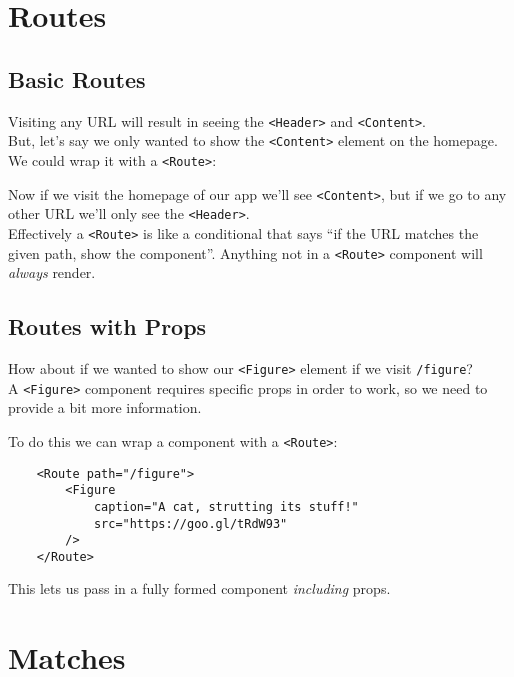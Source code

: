 \pagebreak


\section{Routes}

\subsection{Basic Routes}

Visiting any URL will result in seeing the \texttt{<Header>} and \texttt{<Content>}.
\\

But, let's say we only wanted to show the \texttt{<Content>} element on the homepage. We could wrap it with a \texttt{<Route>}:


Now if we visit the homepage of our app we'll see \texttt{<Content>}, but if we go to any other URL we'll only see the \texttt{<Header>}.
\\

Effectively a \texttt{<Route>} is like a conditional that says ``if the URL matches the given path, show the component''. Anything not in a \texttt{<Route>} component will \textit{always} render.


\subsection{Routes with Props}

How about if we wanted to show our \texttt{<Figure>} element if we visit \texttt{/figure}?
\\

A \texttt{<Figure>} component requires specific props in order to work, so we need to provide a bit more information.

\pagebreak

To do this we can wrap a component with a \texttt{<Route>}:

\begin{verbatim}
    <Route path="/figure">
        <Figure
            caption="A cat, strutting its stuff!"
            src="https://goo.gl/tRdW93"
        />
    </Route>
\end{verbatim}

This lets us pass in a fully formed component \textit{including} props.



\section{Matches}

